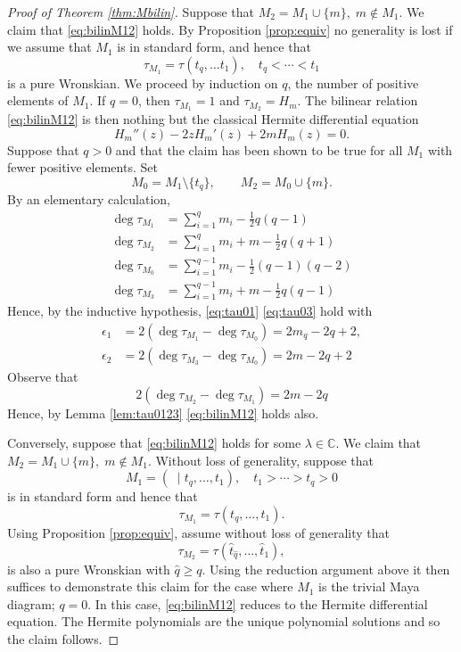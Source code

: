 \documentclass{amsart}
\theoremstyle{definition}
\newcommand{\C}{\mathbb{C}}
\newcommand{\hq}{\hat{q}}
\newcommand{\hatt}{\hat{t}}
\begin{document}
\begin{proof}[Proof of Theorem \ref{thm:Mbilin}]
  Suppose that $M_2= M_1\cup \{m\},\; m\notin M_1$.  We claim that
  \eqref{eq:bilinM12} holds. By Proposition \ref{prop:equiv} no
  generality is lost if we assume that $M_1$ is in standard form, and
  hence that
  \[ \tau_{M_1} = \tau(t_q,\ldots t_1),\quad t_q< \cdots < t_1 \] is a
  pure Wronskian.  We proceed by induction on $q$, the number of
  positive elements of $M_1$.  If $q=0$, then $\tau_{M_1}=1$ and
  $\tau_{M_2} = H_m$.  The bilinear relation \eqref{eq:bilinM12} is
  then nothing but the classical Hermite differential equation
  \[ H_m''(z) - 2z H_m'(z) + 2m H_m(z) = 0.\] Suppose that $q>0$ and
  that the claim has been shown to be true for all $M_1$ with fewer
  positive elements.  Set
  \[ M_0 = M_1 \setminus \{ t_q\},\qquad M_2 = M_0 \cup \{ m \}.\]
  By an elementary calculation,
  \begin{align*}
    \deg \tau_{M_1} &=  \sum_{i=1}^q m_i - \frac12 q(q-1)\\
    \deg \tau_{M_2} &=  \sum_{i=1}^q m_i + m -  \frac12 q(q+1)\\
    \deg \tau_{M_0} &=  \sum_{i=1}^{q-1} m_i - \frac12 (q-1)(q-2)\\
    \deg \tau_{M_3} &=  \sum_{i=1}^{q-1} m_i + m - \frac12 q(q-1)
  \end{align*}
  Hence, by the inductive hypothesis, \eqref{eq:tau01}
  \eqref{eq:tau03} hold with
  \begin{align*}
    \epsilon_1 &= 2(\deg \tau_{M_1} - \deg \tau_{M_0}) = 2m_q-2q+2,\\
    \epsilon_2 &= 2(\deg \tau_{M_3} - \deg \tau_{M_0}) = 2m-2q+2   
  \end{align*}
  Observe that
  \[ 2(\deg \tau_{M_2} - \deg \tau_{M_1}) = 2m-2q\]
  Hence, by Lemma \ref{lem:tau0123} \eqref{eq:bilinM12} holds also.

  Conversely, suppose that \eqref{eq:bilinM12} holds for some
  $\lambda\in \C$.  We claim that
  $M_2 = M_1 \cup \{m\},\; m\notin M_1$.
  Without loss of generality, suppose that
  \[ M_1 = (\;\mid t_q, \ldots, t_1    ),\quad t_1>\cdots > t_q>0 \]
  is in standard form and hence that
  \[ \tau_{M_1} = \tau(t_q,\ldots, t_1).\] Using Proposition
  \ref{prop:equiv}, assume without loss of generality that
  \[ \tau_{M_2} = \tau(\hatt_{\hq},\ldots, \hatt_1),\] is also
  a pure Wronskian with $\hq \geq q$.  Using the reduction argument
  above it then suffices to demonstrate this claim for the case where
  $M_1$ is the trivial Maya diagram; $q=0$.  In this case,
  \eqref{eq:bilinM12} reduces to the Hermite differential equation.
  The Hermite polynomials are the unique polynomial solutions and so
  the claim follows.
\end{proof}
\end{document}
